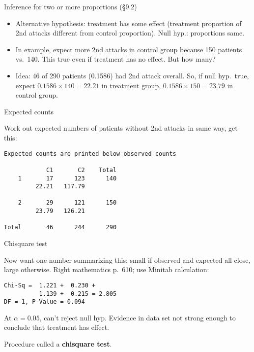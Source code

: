\begin{slide}{Inference for two or more proportions (\S 9.2)}
  \begin{itemize}
  \item 
Alternative hypothesis: treatment has some effect (treatment
proportion of 2nd attacks different from control proportion). Null
hyp.: proportions same.

\item In example, expect more 2nd attacks in control group because 150
patients vs.\ 140. This true even if treatment has no effect. But how
many? 

\item Idea: 46 of 290 patients (0.1586) had 2nd attack overall. So, if
null hyp.\ true, expect $0.1586\times 140=22.21$ in treatment group,
$0.1586 \times 150=23.79$ in control group.

  \end{itemize}
\end{slide}
\begin{slide}{Expected counts}

Work out expected numbers of patients without 2nd attacks in same way,
get this:

\scriptsize
\begin{verbatim}
Expected counts are printed below observed counts

            C1       C2    Total
    1       17      123      140
         22.21   117.79

    2       29      121      150
         23.79   126.21

Total       46      244      290
\end{verbatim}
\normalsize

\end{slide}
\begin{slide}{Chisquare test}

Now want one number summarizing this: small if observed and expected all
close, large otherwise. Right mathematics p.\ 610; use Minitab
calculation:

\scriptsize
\begin{verbatim}
Chi-Sq =  1.221 +  0.230 +
          1.139 +  0.215 = 2.805
DF = 1, P-Value = 0.094
\end{verbatim}
\normalsize

At $\alpha=0.05$, can't reject null hyp. Evidence in data set not
strong enough to conclude that treatment has effect.

Procedure called a {\bf chisquare test}. 

\end{slide}

